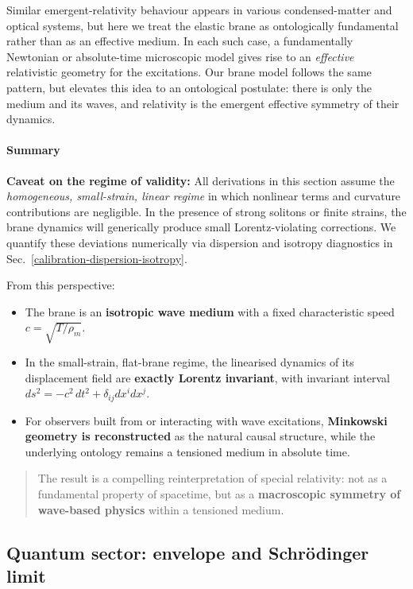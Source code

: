 Similar emergent-relativity behaviour appears in various
condensed-matter and optical systems, but here we treat the
elastic brane as ontologically fundamental rather than as an
effective medium. In each such case, a fundamentally Newtonian or absolute-time microscopic
model gives rise to an \emph{effective} relativistic geometry for the
excitations. Our brane model follows the same pattern, but elevates this
idea to an ontological postulate: there is only the medium and its
waves, and relativity is the emergent effective symmetry of their
dynamics.

\paragraph{Summary}\label{emergent-lorentz-summary}

\textbf{Caveat on the regime of validity:} All derivations in this section assume the \emph{homogeneous, small-strain, linear regime} in which nonlinear terms and curvature contributions are negligible. In the presence of strong solitons or finite strains, the brane dynamics will generically produce small Lorentz-violating corrections. We quantify these deviations numerically via dispersion and isotropy diagnostics in Sec.~\ref{calibration-dispersion-isotropy}.

From this perspective:
\begin{itemize}
\item The brane is an \textbf{isotropic wave medium} with a fixed
      characteristic speed $c=\sqrt{T/\rho_m}$.
\item In the small-strain, flat-brane regime, the linearised dynamics
      of its displacement field are \textbf{exactly Lorentz invariant},
      with invariant interval
      $ds^2 = -c^2\,dt^2 + \delta_{ij}dx^i dx^j$.
\item For observers built from or interacting with wave excitations,
      \textbf{Minkowski geometry is reconstructed} as the natural causal
      structure, while the underlying ontology remains a tensioned
      medium in absolute time.
\end{itemize}

\begin{quote}
The result is a compelling reinterpretation of special relativity: not
as a fundamental property of spacetime, but as a \textbf{macroscopic
symmetry of wave-based physics} within a tensioned medium.
\end{quote}

\subsection{Quantum sector: envelope and Schr\"odinger limit}
\label{sec:quantum-envelope}\label{wave-mechanics-and-quantum-behavior}\label{sec:wave-mechanics}

